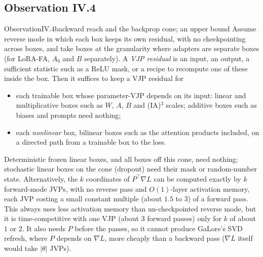 \subsection{Observation IV.4}\label{proof:IV.4}

\begin{restate}{Observation}{IV.4}{backward reach and the backprop cone; an upper bound}
Assume reverse mode in which each box keeps its own residual, with no checkpointing across boxes, and take boxes at the
granularity where adapters are separate boxes (for LoRA-FA, $A_0$ and $B$ separately). A \emph{VJP residual} is an input,
an output, a sufficient statistic such as a ReLU mask, or a recipe to recompute one of these inside the box. Then it
suffices to keep a VJP residual for
\begin{itemize}
  \item each trainable box whose parameter-VJP depends on its input: linear and multiplicative boxes such as $W$, $A$, $B$
  and (IA)$^3$ scales; additive boxes such as biases and prompts need nothing;
  \item each \emph{nonlinear} box, bilinear boxes such as the attention products included, on a directed path from a
  trainable box to the loss.
\end{itemize}
Deterministic frozen linear boxes, and all boxes off this cone, need nothing; stochastic linear boxes on the cone
(dropout) need their mask or random-number state. Alternatively, the $k$ coordinates of $P^\top\nabla L$ can be computed
exactly by $k$ forward-mode JVPs, with no reverse pass and $O(1)$-layer activation memory, each JVP costing a small
constant multiple (about $1.5$ to $3$) of a forward pass. This always uses less activation memory than un-checkpointed
reverse mode, but it is time-competitive with one VJP (about $3$ forward passes) only for $k$ of about $1$ or $2$. It also
needs $P$ before the passes, so it cannot produce GaLore's SVD refresh, where $P$ depends on $\nabla L$, more cheaply than a
backward pass ($\nabla L$ itself would take $\lvert\theta\rvert$ JVPs).
\end{restate}

